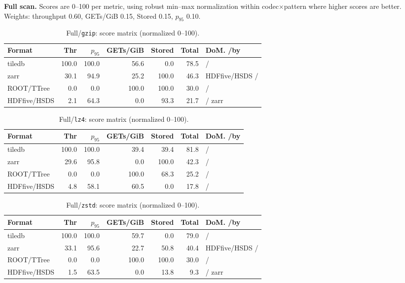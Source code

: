 \documentclass[nomenclature, english, bibtex]{kththesis}
\numberwithin{listing}{chapter}
\begin{document}
\textbf{Full scan.} Scores are 0–100 per metric, using robust min–max normalization within codec$\times$pattern where higher scores are better. Weights: throughput 0.60, GETs/GiB 0.15, Stored 0.15, $p_{95}$ 0.10.

\begin{table}[H]
  \centering
  \caption{Full/\texttt{gzip}: score matrix (normalized 0–100).}
  \label{tab:scores-full-gzip}
  \begin{tabular}{lrrrrrl}
    \toprule
    Format & Thr & $p_{95}$ & GETs/GiB & Stored & Total & \gls{DoM}. /by \\
    \midrule
    tiledb & 100.0 & 100.0 & 56.6 & 0.0  & 78.5 & / \\
    zarr   & 30.1  & 94.9  & 25.2 & 100.0& 46.3 & \gls{HDFfive}/\gls{HSDS} / \\
    \gls{ROOT}/\gls{TTree}   & 0.0   & 0.0   & 100.0& 100.0& 30.0 & / \\
    \gls{HDFfive}/\gls{HSDS}   & 2.1   & 64.3  & 0.0  & 93.3 & 21.7 & / zarr \\
    \bottomrule
  \end{tabular}
\end{table}

\begin{table}[H]
  \centering
  \caption{Full/\texttt{lz4}: score matrix (normalized 0–100).}
  \label{tab:scores-full-lz4}
  \begin{tabular}{lrrrrrl}
    \toprule
    Format & Thr & $p_{95}$ & GETs/GiB & Stored & Total & \gls{DoM}. /by \\
    \midrule
    tiledb & 100.0 & 100.0 & 39.4 & 39.4 & 81.8 & / \\
    zarr   & 29.6  & 95.8  & 0.0  & 100.0& 42.3 & / \\
    \gls{ROOT}/\gls{TTree}   & 0.0   & 0.0   & 100.0& 68.3 & 25.2 & / \\
    \gls{HDFfive}/\gls{HSDS}   & 4.8   & 58.1  & 60.5 & 0.0  & 17.8 & / \\
    \bottomrule
  \end{tabular}
\end{table}

\begin{table}[H]
  \centering
  \caption{Full/\texttt{zstd}: score matrix (normalized 0–100).}
  \label{tab:scores-full-zstd}
  \begin{tabular}{lrrrrrl}
    \toprule
    Format & Thr & $p_{95}$ & GETs/GiB & Stored & Total & \gls{DoM}. /by \\
    \midrule
    tiledb & 100.0 & 100.0 & 59.7 & 0.0  & 79.0 & / \\
    zarr   & 33.1  & 95.6  & 22.7 & 50.8 & 40.4 & \gls{HDFfive}/\gls{HSDS} / \\
    \gls{ROOT}/\gls{TTree}   & 0.0   & 0.0   & 100.0& 100.0& 30.0 & / \\
    \gls{HDFfive}/\gls{HSDS}   & 1.5   & 63.5  & 0.0  & 13.8 & 9.3  & / zarr \\
    \bottomrule
  \end{tabular}
\end{table}
\end{document}

